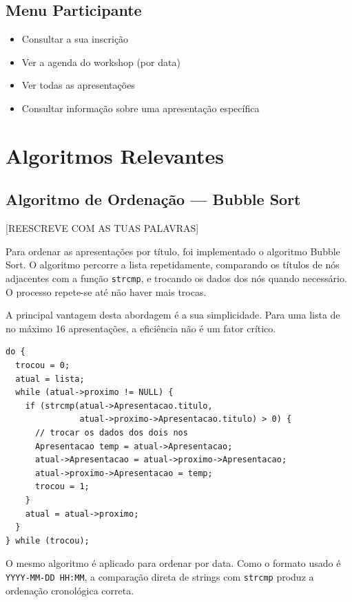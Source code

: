 \documentclass[12pt,a4paper]{article}
\begin{document}
\subsection{Menu Participante}

\begin{itemize}
  \item Consultar a sua inscrição
  \item Ver a agenda do workshop (por data)
  \item Ver todas as apresentações
  \item Consultar informação sobre uma apresentação específica
\end{itemize}

\section{Algoritmos Relevantes}

\subsection{Algoritmo de Ordenação — Bubble Sort}

[REESCREVE COM AS TUAS PALAVRAS]

Para ordenar as apresentações por título, foi implementado o algoritmo Bubble Sort. O algoritmo percorre a lista repetidamente, comparando os títulos de nós adjacentes com a função \texttt{strcmp}, e trocando os dados dos nós quando necessário. O processo repete-se até não haver mais trocas.

A principal vantagem desta abordagem é a sua simplicidade. Para uma lista de no máximo 16 apresentações, a eficiência não é um fator crítico.

\begin{lstlisting}[style=cstyle, caption={Bubble Sort por título}]
do {
  trocou = 0;
  atual = lista;
  while (atual->proximo != NULL) {
    if (strcmp(atual->Apresentacao.titulo,
               atual->proximo->Apresentacao.titulo) > 0) {
      // trocar os dados dos dois nos
      Apresentacao temp = atual->Apresentacao;
      atual->Apresentacao = atual->proximo->Apresentacao;
      atual->proximo->Apresentacao = temp;
      trocou = 1;
    }
    atual = atual->proximo;
  }
} while (trocou);
\end{lstlisting}

O mesmo algoritmo é aplicado para ordenar por data. Como o formato usado é \texttt{YYYY-MM-DD HH:MM}, a comparação direta de strings com \texttt{strcmp} produz a ordenação cronológica correta.
\end{document}
